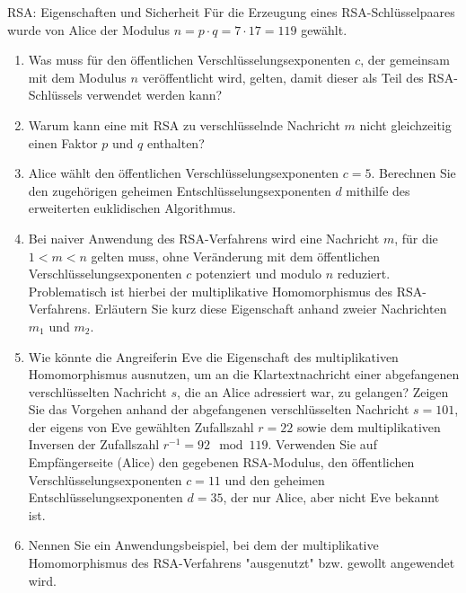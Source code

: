 \documentclass{article}
\begin{document}
\setcounter{subsection}{162}
\begin{exercise}{RSA: Eigenschaften und Sicherheit}\label{ex:rsa}
  Für die Erzeugung eines RSA-Schlüsselpaares wurde von Alice der Modulus $n= p \cdot q= 7 \cdot 17= 119$ gewählt.
  \begin{enumerate}
    \item Was muss für den öffentlichen Verschlüsselungsexponenten $c$, der gemeinsam mit dem Modulus $n$ veröffentlicht wird, gelten, damit dieser als Teil des RSA-Schlüssels verwendet werden kann?
    \item Warum kann eine mit RSA zu verschlüsselnde Nachricht $m$ nicht gleichzeitig einen Faktor $p$ und $q$ enthalten?
    \item Alice wählt den öffentlichen Verschlüsselungsexponenten $c= 5$. Berechnen Sie den zugehörigen geheimen Entschlüsselungsexponenten $d$ mithilfe des erweiterten euklidischen Algorithmus.
    \item Bei naiver Anwendung des RSA-Verfahrens wird eine Nachricht $m$, für die $1 < m < n$ gelten muss, ohne Veränderung mit dem öffentlichen Verschlüsselungsexponenten $c$ potenziert und modulo $n$ reduziert. Problematisch ist hierbei der multiplikative Homomorphismus des RSA-Verfahrens. Erläutern Sie kurz diese Eigenschaft anhand zweier Nachrichten $m_1$ und $m_2$.
    \item Wie könnte die Angreiferin Eve die Eigenschaft des multiplikativen Homomorphismus ausnutzen, um an die Klartextnachricht einer abgefangenen verschlüsselten Nachricht $s$, die an Alice adressiert war, zu gelangen? Zeigen Sie das Vorgehen anhand der abgefangenen verschlüsselten Nachricht $s= 101$, der eigens von Eve gewählten Zufallszahl $r= 22$ sowie dem multiplikativen Inversen der Zufallszahl $r^{-1} = 92 \mod 119$. Verwenden Sie auf Empfängerseite (Alice) den gegebenen RSA-Modulus, den öffentlichen Verschlüsselungsexponenten $c=11$ und den geheimen Entschlüsselungsexponenten $d=35$, der nur Alice, aber nicht Eve bekannt ist.
    \item Nennen Sie ein Anwendungsbeispiel, bei dem der multiplikative Homomorphismus des RSA-Verfahrens "ausgenutzt" bzw. gewollt angewendet wird.
  \end{enumerate}


\end{exercise}
\end{document}
